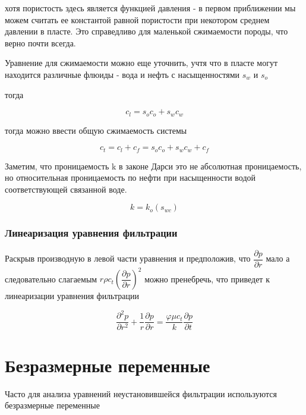 хотя пористость здесь является функцией давления - в первом приближении мы можем считать ее константой равной пористости при некотором среднем давлении в пласте. Это справедливо для маленькой сжимаемости породы, что верно почти всегда.

Уравнение для сжимаемости можно еще уточнить, учтя что в пласте могут находится различные флюиды - вода и нефть с насыщенностями  $s_w$ и $s_o$

тогда 

$$ c_l = s_o c_o + s_w c_w $$

тогда можно ввести общую сжимаемость системы 

$$ c_t = c_l + c_f = s_o c_o + s_w c_w  + c_f $$ 

Заметим, что проницаемость k в законе Дарси это не абсолютная проницаемость, но относительная проницаемость по нефти при насыщенности водой соответствующей связанной воде.  

$$ k= k_o (s_{wc}) $$

\subsubsection{Линеаризация уравнения фильтрации}

Раскрыв производную в левой части уравнения и предположив, что $\dfrac{\partial p}{\partial r}$ мало а следовательно слагаемым  $ r \rho c_t \left( \dfrac{\partial p}{\partial r} \right)^2 $ можно пренебречь, что приведет к линеаризации уравнения фильтрации

\begin{equation} \label{eq:diff_eq_lin}
\frac{\partial^2 p}{\partial r^2} + \frac{1}{r} \frac{\partial p}{\partial r}= \frac{\varphi \mu c_t}{k} \frac{\partial p}{\partial t}
\end{equation}



\section{Безразмерные переменные}

Часто для анализа уравнений неустановившейся фильтрации используются безразмерные переменные 

